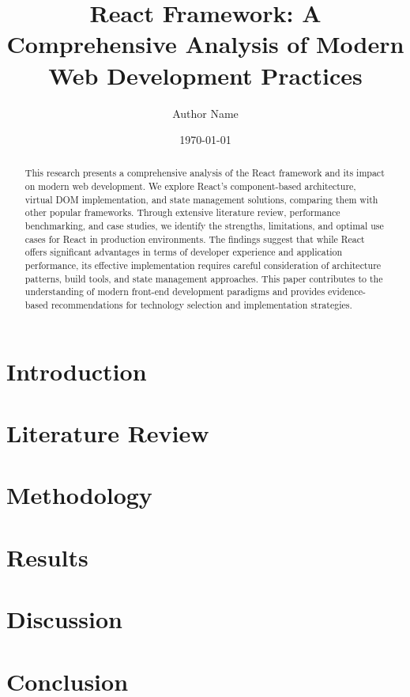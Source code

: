 \documentclass[12pt,a4paper]{article}
\title{React Framework: A Comprehensive Analysis of Modern Web Development Practices}
\author{Author Name}
\date{\today}
\begin{document}
\maketitle

\begin{abstract}
This research presents a comprehensive analysis of the React framework and its impact on modern web development. We explore React's component-based architecture, virtual DOM implementation, and state management solutions, comparing them with other popular frameworks. Through extensive literature review, performance benchmarking, and case studies, we identify the strengths, limitations, and optimal use cases for React in production environments. The findings suggest that while React offers significant advantages in terms of developer experience and application performance, its effective implementation requires careful consideration of architecture patterns, build tools, and state management approaches. This paper contributes to the understanding of modern front-end development paradigms and provides evidence-based recommendations for technology selection and implementation strategies.
\end{abstract}

\section{Introduction}


\section{Literature Review}


\section{Methodology}


\section{Results}


\section{Discussion}


\section{Conclusion}




\end{document}
